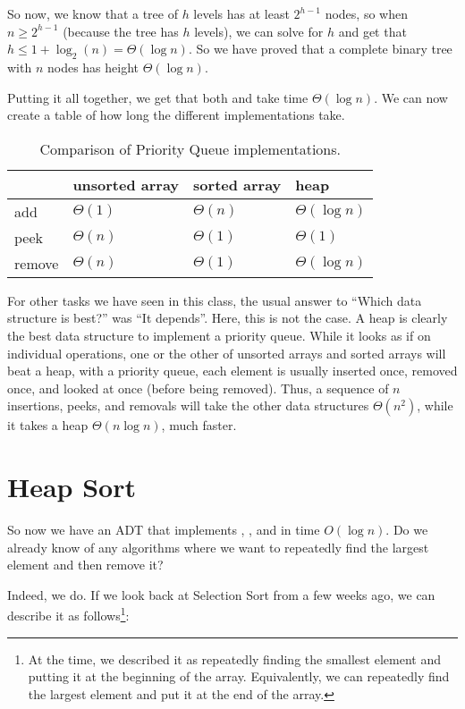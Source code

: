 So now, we know that a tree of $h$ levels has at least $2^{h-1}$
nodes, so when $n \geq 2^{h-1}$ (because the tree has $h$ levels),
we can solve for $h$ and get that $h \leq 1 + \log_2 (n) = \Theta(\log n)$.
So we have proved that a complete binary tree with $n$ nodes has 
height $\Theta(\log n)$.
					
Putting it all together, we get that both  and
 take time $\Theta(\log n)$. 
We can now create a table of how long the different implementations
take.

\begin{table}[htb]
\begin{center}
\begin{tabular}{|l|l|l|l|}
\hline
& unsorted array & sorted array & heap \\
\hline
add    & $\Theta(1)$ & $\Theta(n)$ & $\Theta(\log n)$ \\[1ex]
peek   & $\Theta(n)$ & $\Theta(1)$ & $\Theta(1)$ \\[1ex]
remove & $\Theta(n)$ & $\Theta(1)$ & $\Theta(\log n)$\\
\hline
\end{tabular}
\end{center}
\caption{Comparison of Priority Queue implementations.}
\end{table}

For other tasks we have seen in this class, the usual answer to
``Which data structure is best?'' was ``It depends''.
Here, this is not the case. A heap is clearly the best data structure
to implement a priority queue. While it looks as if on individual
operations, one or the other of unsorted arrays and sorted arrays will
beat a heap, with a priority queue, each element is usually inserted
once, removed once, and looked at once (before being removed).
Thus, a sequence of $n$ insertions, peeks, and removals will take the
other data structures $\Theta(n^2)$, while it takes a heap 
$\Theta(n \log n)$, much faster.

\section{Heap Sort}
So now we have an ADT that implements , , and
 in time $O(\log n)$. Do we already know of any algorithms
where we want to repeatedly find the largest element and then remove
it?

Indeed, we do. If we look back at Selection Sort from a few weeks ago,
we can describe it as follows\footnote{At the time, we described it as
  repeatedly finding the smallest element and putting it at the
  beginning of the array. Equivalently, we can repeatedly find the
  largest element and put it at the end of the array.}:

